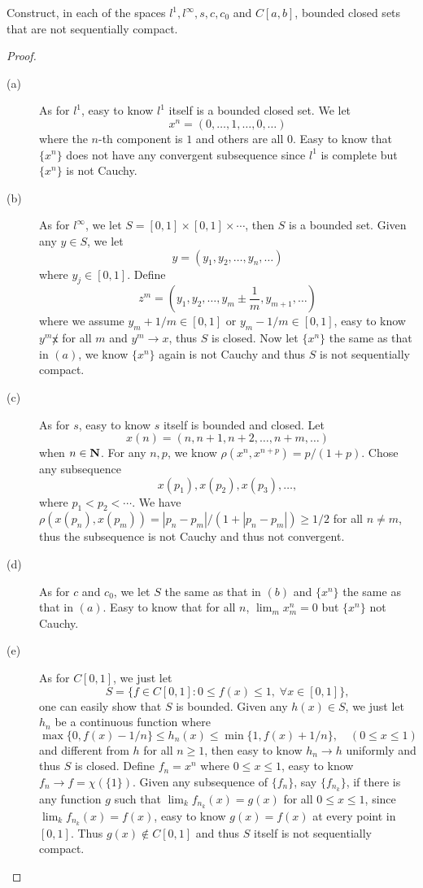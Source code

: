 \begin{pro}%
	Construct, in each of the spaces $l^1,l^\infty,s,c,c_0$ and $C[a,b]$, bounded closed sets that are not sequentially compact.
\end{pro}
\begin{proof}
	\begin{description}
	\item[(a)] As for $l^1$, easy to know $l^1$ itself is a bounded closed set. We let
	\[x^n=(0,\dots,1,\dots,0,\dots)\]
	where the $n$-th component is $1$ and others are all $0$. Easy to know that $\{x^n\}$ does not have any convergent subsequence since $l^1$ is complete but $\{x^n\}$ is not Cauchy.
	\item[(b)] As for $l^\infty$, we let $S=[0,1]\times[0,1]\times\cdots$, then $S$ is a bounded set. Given any $y\in S$, we
	let
	\[y=(y_1,y_2,\dots,y_n,\dots)\]
	where $y_j\in[0,1]$. Define
	\[z^m=(y_1,y_2,\dots,y_m\pm \frac{1}{m},y_{m+1},\dots)\]
	where we assume $y_m+1/m\in[0,1]$ or $y_m-1/m\in[0,1]$, easy to know $y^m\not x$ for all $m$ and $y^m\to x$, thus $S$ is closed. Now let $\{x^n\}$ the same as that in $(a)$, we know $\{x^n\}$ again is not Cauchy and thus $S$ is not sequentially compact.
	\item[(c)] As for $s$, easy to know $s$ itself is bounded and closed. Let
	\[x(n)=(n,n+1,n+2,\dots,n+m,\dots)\]
	when $n\in\mathbf{N}$. For any $n,p$, we know $\rho(x^n,x^{n+p})=p/(1+p)$. Chose any subsequence
	\[x(p_1),x(p_2),x(p_3),\dots,\]
	where $p_1<p_2<\cdots$. We have $\rho(x(p_n),x(p_m))=|p_n-p_m|/(1+|p_n-p_m|)\geq 1/2$ for all $n\neq m$, thus the subsequence is not Cauchy and thus not convergent. 
	\item[(d)] As for $c$ and $c_0$, we let $S$ the same as that in $(b)$ and $\{x^n\}$ the same as that in $(a)$. Easy to know that for all $n$, $\lim_m x_m^n=0$ but $\{x^n\}$ not Cauchy.
	\item[(e)] As for $C[0,1]$, we just let
	\[S=\{f\in C[0,1]\colon 0\leq f(x)\leq 1,\;\forall x\in[0,1]\},\]
	one can easily show that $S$ is bounded. Given any $h(x)\in S$, we just let $h_n$ be a continuous function where 
	\[\max\{0,f(x)-1/n\}\leq h_n(x)\leq \min\{1,f(x)+1/n\},\quad(0\leq x\leq 1)\]
	and different from $h$ for all $n\geq 1$, then easy to know $h_n\to h$ uniformly and thus $S$ is closed. Define $f_n=x^n$ where $0\leq x\leq 1$, easy to know $f_n\to f=\chi(\{1\})$. Given any subsequence of $\{f_n\}$, say $\{f_{n_k}\}$, if there is any function $g$ such that $\lim_k f_{n_k}(x)=g(x)$ for all $0\leq x\leq 1$, since $\lim_k f_{n_k}(x)=f(x)$, easy to know $g(x)=f(x)$ at every point in $[0,1]$. Thus $g(x)\notin C[0,1]$ and thus $S$ itself is not sequentially compact.
	\end{description}
\end{proof}

